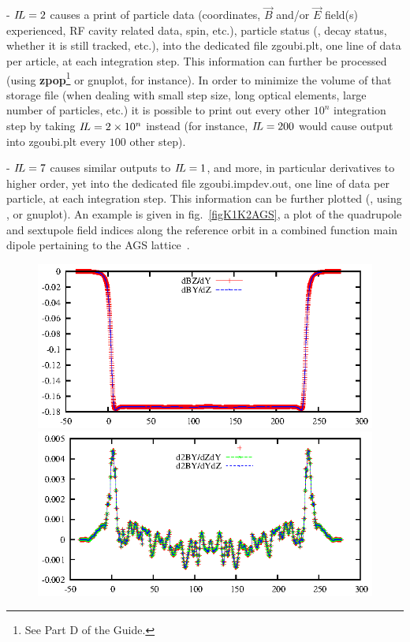 {\smallskip 

- $ I\!L=2 $ causes a print of particle data (coordinates, $\vec B $ and/or $\vec E$ field(s) experienced, 
RF cavity related data, spin, etc.), 
particle status (\eg, decay status,  whether it is still tracked, etc.), 
into the dedicated file  zgoubi.plt, 
one line of data per article, at each integration step. This information  can further be processed 
(using \textbf{zpop}\footnote{See Part D of the Guide.} or gnuplot, for instance). In order to minimize  the volume of 
that storage file (when dealing with small step size, long optical elements, large number of particles, etc.) it is possible 
to print out  every other $10^n$ integration step by taking $ I\!L=2 \times 10^n $ instead (for instance, 
 $ I\!L=200 $ would cause output into zgoubi.plt every $100$ other step). 

\smallskip 

- $ I\!L=7 $ causes similar outputs to  $ I\!L=1 $, and more, in particular derivatives to higher order, yet 
 into the dedicated file  zgoubi.impdev.out, 
one line of data per particle,  at each integration step. This information 
 can be further  plotted (\eg, using \zpop, or gnuplot). 
An example is given in fig.~\ref{figK1K2AGS}, a plot of the quadrupole and sextupole 
field indices along the reference orbit 
in a combined function main dipole pertaining to the AGS lattice~\cite{AGSModel}. 

\begin{figure}[h]
\centering
    \includegraphics*[width=.48\linewidth]{gnuplot_bderiv_DB.eps}
    \includegraphics*[width=.48\linewidth]{gnuplot_bderiv_DDB.eps}
{\setlength{\captionwidth}{0.99\linewidth}
}
\end{figure}
%

}
